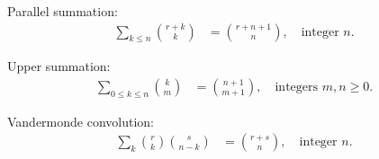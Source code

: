 \begin{identity}
    Parallel summation:
    \begin{align*}
        \sum_{k \leq n} \binom{r + k}{k} &= \binom{r + n + 1}{n}, \quad \text{integer } n.
    \end{align*}
\end{identity}

\begin{identity}
    Upper summation:
    \begin{align*}
        \sum_{0 \leq k \leq n} \binom{k}{m} &= \binom{n + 1}{m + 1}, \quad \text{integers } m, n \geq 0.
    \end{align*}
\end{identity}

\begin{identity}
    Vandermonde convolution:
    \begin{align*}
        \sum_{k} \binom{r}{k} \binom{s}{n-k} &= \binom{r + s}{n}, \quad \text{integer } n.
    \end{align*}
\end{identity}




\clearpage
